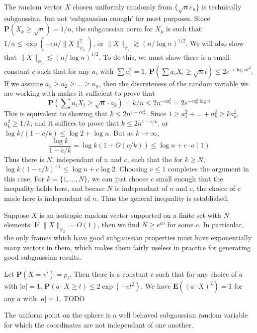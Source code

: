 \begin{example}
    The random vector $X$ chosen uniformly randomly from $\{ \sqrt{n} e_n \}$ is technically subgaussian, but not `subgaussian enough' for most purposes. Since $\mathbf{P}(X_k \geq \sqrt{n}) = 1/n$, the subgaussian norm for $X_k$ is such that $1/n \leq \exp(-cn/\| X \|_{\psi_2}^2)$, or $\| X \|_{\psi_2} \gtrsim (n/\log n)^{1/2}$. We will also show that $\| X \|_{\psi_2} \lesssim (n/\log n)^{1/2}$. To do this, we must show there is a small constant $c$ such that for any $a_i$ with $\sum a_i^2 = 1$, $\mathbf{P}(\sum a_i X_i \geq \sqrt{n}t) \leq 2e^{-c \log n t^2}$. If we assume $a_1 \geq a_2 \geq \dots \geq a_n$, then the discreteness of the random variable we are working with makes it sufficient to prove that
    \[ \mathbf{P} \left(\sum a_i X_i \geq \sqrt{n} \cdot a_k \right) = k/n \leq 2 n^{-ca_k^2} = 2 e^{-ca_k^2 \log n} \]
    This is equivalent to showing that $k \leq 2n^{1-ca_k^2}$. Since $1 \geq a_1^2 + \dots + a_k^2 \geq ka_k^2$, $a_k^2 \geq 1/k$, and it suffices to prove that $k \leq 2n^{1-c/k}$, or $\log k / (1 - c/k) \leq \log 2 + \log n$. But as $k \to \infty$,
    \[ \frac{\log k}{1 - c/k} = \log k (1 + O(c/k)) \leq \log n + c \cdot o(1) \]
    Thus there is $N$, independant of $n$ and $c$, such that the for $k \geq N$, $\log k (1 - c/k)^{-1} \leq \log n + c \log 2$. Choosing $c \leq 1$ completes the argument in this case. For $k = \{ 1, \dots, N \}$, we can just choose $c$ small enough that the inequality holds here, and becase $N$ is independant of $n$ and $c$, the choice of $c$ made here is independant of $n$. Thus the general inequality is established.
\end{example}

\begin{example}
    Suppose $X$ is an isotropic random vector supported on a finite set with $N$ elements. If $\| X \|_{\psi_2} = O(1)$, then we find $N \geq e^{cn}$ for some $c$. In particular, the only frames which have good subgaussian properties must have exponentially many vectors in them, which makes them fairly useless in practice for generating good subgaussian results.

    Let $\mathbf{P}(X = v^i) = p_i$. Then there is a constant $c$ such that for any choice of $a$ with $|a| = 1$, $\mathbf{P}(a \cdot X \geq t) \leq 2\exp(-ct^2)$. We have $\mathbf{E}((a \cdot X)^2) = 1$ for any $a$ with $|a| = 1$. TODO
\end{example}

The uniform point on the sphere is a well behaved subgaussian random variable for which the coordinates are not independant of one another.

